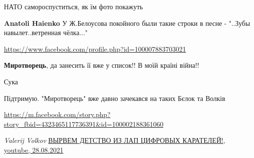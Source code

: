 \begin{itemize}
\begin{itemize}
 
НАТО самороспуститься, як їм фото покажуть

 
\textbf{Anatoli Haienko} У Ж.Белоусова покойного были такие строки в песне - "..Зубы навылет..ветренная чёлка..."\Laughey[1.0][white]
\end{itemize}

\url{https://www.facebook.com/profile.php?id=100007883703021}\par
 
\textbf{Миротворець}, да занесить її вже у список!! В моїй країні війна!!

\begin{itemize}
 
Сука

 
Підтримую.
"Миротворець" вже давно зачекався на таких Бєлок та Волків
\end{itemize}

 
\url{https://m.facebook.com/story.php?story_fbid=4323465117736391&id=100002188361060}

\emph{Valerij Volkov}
\href{https://youtu.be/f97yd0Fit8s}{%
ВЫРВЕМ ДЕТСТВО ИЗ ЛАП ЦИФРОВЫХ КАРАТЕЛЕЙ!, youtube, 28.08.2021%
}

\end{itemize}

